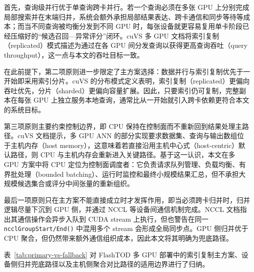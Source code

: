 首先，查询级并行优于单查询跨卡并行。若一个查询必须在多张 GPU 上分别完成局部搜索并在末端归并，系统会额外承担局部结果表达、跨卡通信和同步等待等成本；而当不同查询被均衡分发到不同 GPU 时，每张设备就更容易复用单卡阶段已经压缩好的``候选召回---异常评分''闭环。cuVS 多 GPU 文档将索引复制（replicated）模式描述为通过在各 GPU 间分发查询以获得更高查询吞吐（query throughput），这一点与本文的吞吐目标一致\citep{cuvs_multi_gpu_nn}。

在此前提下，第二项原则进一步限定了主方案选择：数据并行与索引复制优先于一开始即采用索引分片。cuVS 的分布模式定义表明，索引复制（replicated）更偏向吞吐优先，分片（sharded）更偏向容量扩展\citep{cuvs_multi_gpu_nn,cuvs_dist_mode}。因此，只要索引仍可复制，完整副本在每张 GPU 上独立服务本地查询，通常比从一开始就引入跨卡依赖更符合本文的系统目标。

第三项原则主要约束控制边界，即 CPU 保持在控制面而不重新回到结果处理主路径。cuVS 文档提示，多 GPU ANN 的部分实现要求数据集、查询与输出数组位于主机内存（host memory），这意味着若直接沿用主机中心式（host-centric）默认路径，则 CPU 与主机内存会重新进入关键路径\citep{cuvs_multi_gpu_ivf_host}。基于这一认识，本文在多 GPU 方案中将 CPU 定位为控制面调度者：它负责请求队列管理、负载均衡、有界批处理（bounded batching）、运行时监控和最终小规模结果汇总，但不承担大规模候选集合或评分中间张量的重新组织。

最后一项原则只在主方案不能直接成立时才发挥作用，即当必须跨卡归并时，归并逻辑尽量下沉到 GPU 侧，并通过 NCCL 等设备间通信机制完成。NCCL 文档指出其通信操作会异步入队到 CUDA stream 上执行，但也警告在同一 \texttt{ncclGroupStart/End()} 中混用多个 stream 会形成全局同步点\citep{nccl_stream_semantics}。GPU 侧归并优于 CPU 聚合，但仍然带来额外通信组织成本，因此本文将其明确为兜底路径。

表~\ref{tab:primary-vs-fallback} 对 FlashTOD 多 GPU 部署中的索引复制主方案、设备侧归并兜底路径以及主机侧聚合对比路径的适用边界进行了归纳。

